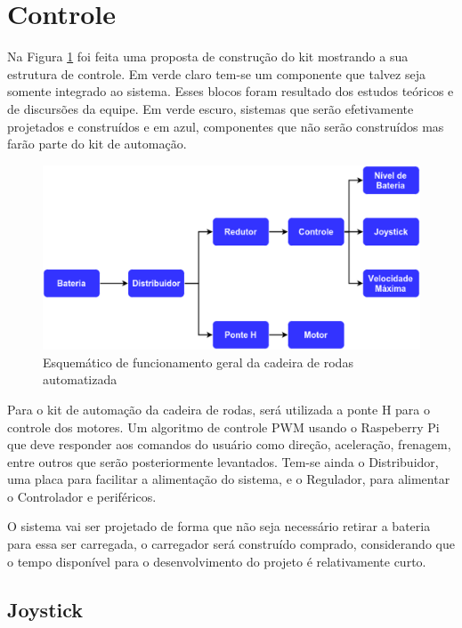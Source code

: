 \section{Controle}

 Na Figura \ref{fig:esquema_controle} foi feita uma proposta de construção do kit mostrando a sua estrutura de controle. Em verde claro tem-se um componente que talvez seja somente integrado ao sistema. Esses blocos foram resultado dos estudos teóricos e de discursões da equipe. Em verde escuro, sistemas que serão efetivamente projetados e construídos e em azul, componentes que não serão construídos mas farão parte do kit de automação.

\begin{figure}[!htb]
\centering
  \includegraphics[keepaspectratio=true,scale=0.5]{figuras/resultados/esquema_controle}
\caption{Esquemático de funcionamento geral da cadeira de rodas automatizada}
\label{fig:esquema_controle}
\end{figure}

Para o kit de automação da cadeira de rodas, será utilizada a ponte H para o controle dos motores. Um algoritmo de controle PWM usando o Raspeberry Pi que deve responder aos comandos do usuário como direção, aceleração, frenagem, entre outros que serão posteriormente levantados. Tem-se ainda o Distribuidor, uma placa para facilitar a alimentação do sistema, e o Regulador, para alimentar o Controlador e periféricos.

O sistema vai ser projetado de forma que não seja necessário retirar a bateria para essa ser carregada, o carregador será construído comprado, considerando que o tempo disponível para o desenvolvimento do projeto é relativamente curto.

\subsection{Joystick}

